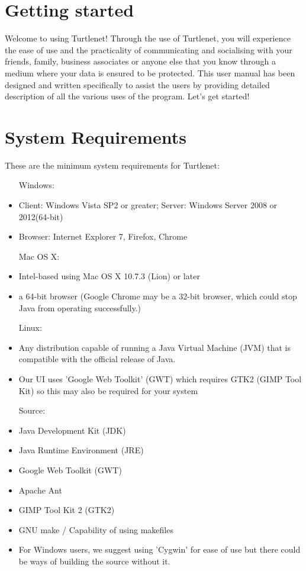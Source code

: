 \section{Getting started}
Welcome to using Turtlenet!  Through the use of Turtlenet, you will experience
the ease of use and the practicality of communicating and socialising with your
friends, family, business associates or anyone else that you know through a
medium where your data is ensured to be protected.  This user manual has been
designed and written specifically to assist the users by providing detailed
description of all the various uses of the program.  Let's get started!

\section{System Requirements}
These are the minimum system requirements for Turtlenet:
\begin{itemize}
\item[Windows:]
\item Client: Windows Vista SP2 or greater; Server: Windows Server 2008 or 
      2012(64-bit)
\item Browser: Internet Explorer 7, Firefox, Chrome

\item[Mac OS X:]
\item Intel-based using Mac OS X 10.7.3 (Lion) or later
\item a 64-bit browser (Google Chrome may be a 32-bit browser, which could stop
                        Java from operating successfully.)
                        
\item[Linux:]
\item Any distribution capable of running a Java Virtual Machine (JVM) that is
      compatible with the official release of Java.
\item Our UI uses 'Google Web Toolkit' (GWT) which requires GTK2 (GIMP Tool Kit)
      so this may also be required for your system
      
\item[Source:]
\item Java Development Kit (JDK)
\item Java Runtime Environment (JRE)
\item Google Web Toolkit (GWT)
\item Apache Ant
\item GIMP Tool Kit 2 (GTK2)
\item GNU make / Capability of using makefiles
\item For Windows users, we suggest using 'Cygwin' for ease of use but there
      could be ways of building the source without it.
\end{itemize}

